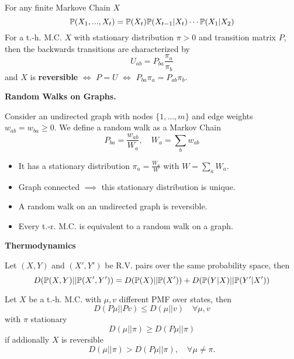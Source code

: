 For any finite Markove Chain \(X\)
\[\P(X_1, ...,X_t) = \P(X_t)\P(X_{t-1}|X_t)\cdots \P(X_1|X_2)\]
For a t.-h. M.C. \(X\) with stationary distribution \(\pi > 0\) and transition matrix \(P\), 
then the backwards transitions are characterized by
\[U_{ab} = P_{ba}\frac{\pi_a}{\pi_b}\]
and \(X\) is \textbf{reversible} \(\iff\) \(P = U\) \(\iff\) \(P_{ba}\pi_a = P_{ab}\pi_b\).

\textbf{Random Walks on Graphs.}

Consider an undirected graph with nodes \(\{1, ..., m\}\) and edge weights \(w_{ab} = w_{ba} \geq 0\). 
We define a random walk as a Markov Chain
\[P_{ba} = \frac{w_{ab}}{W_a}, \quad W_a = \sum_{b}w_{ab}\]
\begin{itemize}[label=-]
    \item It has a stationary distribution \(\pi_a = \frac{W_a}{W}\) with \(W = \sum_a W_a\).
    \item Graph connected \(\implies\) this stationary distribution is unique.
    \item A random walk on an undirected graph is reversible.
    \item Every t.-r. M.C. is equivalent to a random walk on a graph.
\end{itemize}
\textbf{Thermodynamics}

Let \((X, Y)\) and \((X', Y')\) be R.V. pairs over the same probability space, then
\[D(\P(X, Y) || \P(X', Y')) = D(\P(X) || \P(X')) + D(\P(Y|X) || \P(Y'|X'))\]

Let \(X\) be a t.-h. M.C. with \(\mu, v\) different PMF over states, then
\[D(P\mu || Pv) \leq D(\mu || v) \quad \forall \mu, v\]
with \(\pi\) stationary
\[D(\mu || \pi) \geq D(P \mu || \pi)\]
if addionally \(X\) is reversible
\[D(\mu || \pi) > D(P\mu || \pi), \quad \forall \mu \neq \pi.\]



